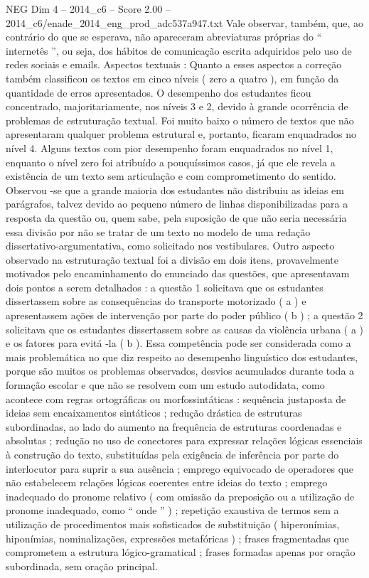 \begin{textsample}{NEG Dim 4 – 2014\_c6 – Score 2.00 – 2014\_c6/enade\_2014\_eng\_prod\_adc537a947.txt}
Vale observar, também, que, ao contrário do que se esperava, não apareceram abreviaturas próprias do “ internetês ”, ou seja, dos hábitos de comunicação escrita adquiridos pelo uso de redes sociais e emails.
Aspectos textuais : Quanto a esses aspectos a correção também classificou os textos em cinco níveis ( zero a quatro ), em função da quantidade de erros apresentados.
O desempenho dos estudantes ficou concentrado, majoritariamente, nos níveis 3 e 2, devido à grande ocorrência de problemas de estruturação textual.
Foi muito baixo o número de textos que não apresentaram qualquer problema estrutural e, portanto, ficaram enquadrados no nível 4.
Alguns textos com pior desempenho foram enquadrados no nível 1, enquanto o nível zero foi atribuído a pouquíssimos casos, já que ele revela a existência de um texto sem articulação e com comprometimento do sentido.
Observou -se que a grande maioria dos estudantes não distribuiu as ideias em parágrafos, talvez devido ao pequeno número de linhas disponibilizadas para a resposta da questão ou, quem sabe, pela suposição de que não seria necessária essa divisão por não se tratar de um texto no modelo de uma redação dissertativo-argumentativa, como solicitado nos vestibulares.
Outro aspecto observado na estruturação textual foi a divisão em dois itens, provavelmente motivados pelo encaminhamento do enunciado das questões, que apresentavam dois pontos a serem detalhados : a questão 1 solicitava que os estudantes dissertassem sobre as consequências do transporte motorizado ( a ) e apresentassem ações de intervenção por parte do poder público ( b ) ; a questão 2 solicitava que os estudantes dissertassem sobre as causas da violência urbana ( a ) e os fatores para evitá -la ( b ).
Essa competência pode ser considerada como a mais problemática no que diz respeito ao desempenho linguístico dos estudantes, porque são muitos os problemas observados, desvios acumulados durante toda a formação escolar e que não se resolvem com um estudo autodidata, como acontece com regras ortográficas ou morfossintáticas : sequência justaposta de ideias sem encaixamentos sintáticos ; redução drástica de estruturas subordinadas, ao lado do aumento na frequência de estruturas coordenadas e absolutas ; redução no uso de conectores para expressar relações lógicas essenciais à construção do texto, substituídas pela exigência de inferência por parte do interlocutor para suprir a sua ausência ; emprego equivocado de operadores que não estabelecem relações lógicas coerentes entre ideias do texto ; emprego inadequado do pronome relativo ( com omissão da preposição ou a utilização de pronome inadequado, como “ onde ” ) ; repetição exaustiva de termos sem a utilização de procedimentos mais sofisticados de substituição ( hiperonímias, hiponímias, nominalizações, expressões metafóricas ) ; frases fragmentadas que comprometem a estrutura lógico-gramatical ; frases formadas apenas por oração subordinada, sem oração principal.

\end{textsample}
